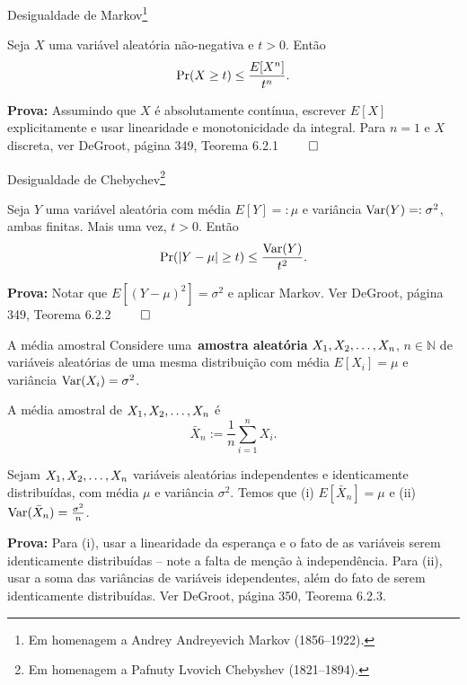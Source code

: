 \begin{frame}{Desigualdade de Markov\footnote{Em homenagem a Andrey Andreyevich Markov (1856–1922).}}
\begin{theo}
 \label{them:Markov_ineq}
 Seja $X$ uma variável aleatória não-negativa e $t > 0$.
Então
\begin{equation}
 \label{eq:Markov_ineq}
 \operatorname{Pr}(X \geq t) \leq \frac{E[X^n]}{t^n}.
\end{equation}
\end{theo}
\textbf{Prova:} Assumindo que $X$ é absolutamente contínua, escrever $E[X]$ explicitamente e usar linearidade e monotonicidade da integral.
Para $n = 1$ e $X$ discreta, ver DeGroot, página 349, Teorema 6.2.1 $\qed$
\end{frame}
\begin{frame}{Desigualdade de Chebychev\footnote{Em homenagem a Pafnuty Lvovich Chebyshev (1821--1894).}}
\begin{theo}
 \label{thm:Chebychev_ineq}
 Seja $Y$ uma variável aleatória com média $E[Y] =: \mu$ e variância $\operatorname{Var}(Y) =: \sigma^2$, ambas finitas.
Mais uma vez, $t>0$.
Então
\begin{equation}
 \label{eq:Chebychev_ineq}
 \operatorname{Pr}(|Y-\mu| \geq t) \leq \frac{\operatorname{Var}(Y)}{t^2}.
\end{equation}
\end{theo}
\textbf{Prova:} Notar que $E[(Y-\mu)^2] = \sigma^2$ e aplicar Markov.
Ver DeGroot, página 349, Teorema 6.2.2 $\qed$
\end{frame}
\begin{frame}{A média amostral}
Considere uma~\textbf{amostra aleatória} $X_1, X_2, \ldots, X_n$, $n \in \mathbb{N}$ de variáveis aleatórias de uma mesma distribuição com média $E[X_i] = \mu$ e variância $\operatorname{Var}(X_i) = \sigma^2$.
\begin{defn}
 A média amostral de $X_1, X_2, \ldots, X_n$ é
 \begin{equation}
  \label{eq:sample_mean}
  \bar{X}_n := \frac{1}{n} \sum_{i = 1}^n X_i.
 \end{equation}
\end{defn}

\begin{theo}
\label{thm:iid_properties}
Sejam  $X_1, X_2, \ldots, X_n$ variáveis aleatórias independentes e identicamente distribuídas, com média $\mu$ e variância $\sigma^2$.
Temos que (i) $E[\bar{X}_n] = \mu$ e (ii) $\operatorname{Var}(\bar{X}_n) = \frac{\sigma^2}{n}$.
\end{theo}
\textbf{Prova:} Para (i), usar a linearidade da esperança e o fato de as variáveis serem identicamente distribuídas -- note a falta de menção à independência.
Para (ii), usar a soma das variâncias de variáveis idependentes, além do fato de serem identicamente distribuídas.
Ver DeGroot, página 350, Teorema 6.2.3.
\end{frame}
